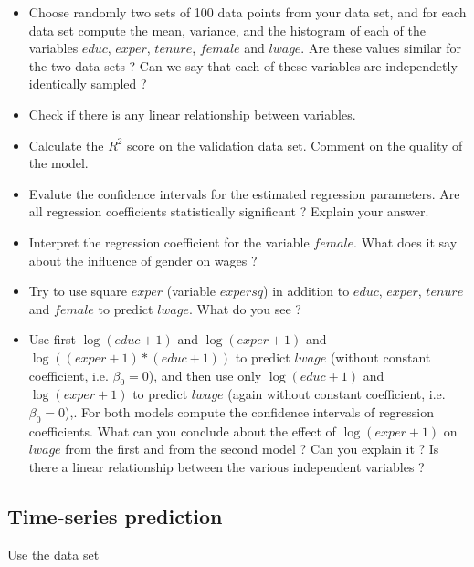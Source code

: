 \documentclass{article}
\begin{document}
  \begin{itemize}
  \item Choose randomly two sets of 100 data points from your data set, and for each data set compute the mean, variance, and the histogram
	of each of the variables  $educ$, $exper$, $tenure$,  $female$  and $lwage$. 
	Are these values similar for the two data sets ?  Can we say that each of these variables are independetly identically sampled ? 
  \item Check if there is any linear relationship between variables. 		  
  \item Calculate the $R^2$ score on the validation data set. Comment on the quality of the model.
  \item Evalute the confidence intervals for the estimated regression parameters. Are all regression coefficients statistically significant ? Explain your answer. 
  \item Interpret the regression coefficient for the variable $female$. What does it say about the influence of gender on wages ?

  \item  Try to use  square $exper$ (variable $expersq$) in addition to $educ$, $exper$, $tenure$ and $female$ to predict $lwage$. What do you see ? 
  \item  Use  first $\log(educ+1)$ and $\log(exper+1)$ and $\log((exper+1)*(educ+1))$ to predict $lwage$ (without constant coefficient, i.e. $\beta_0=0$), and then use only 
	  $\log(educ+1)$ and $\log(exper+1)$ to predict   $lwage$ (again without constant coefficient, i.e. $\beta_0=0$),.  For both models compute the confidence intervals of regression coefficients.
	   What can you conclude about the effect of $\log(exper+1)$ on $lwage$
	  from the first and from the second model ?   Can you explain it ?
	 Is there a  linear relationship between the various independent variables ? 
  \end{itemize}

 \subsection*{Time-series prediction}
   Use the data set  
\end{document}
